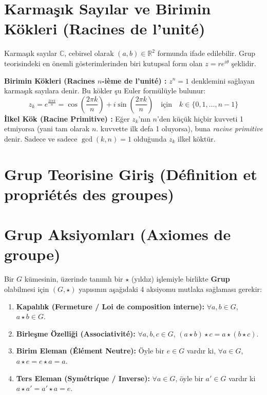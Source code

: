 \documentclass[12pt,a4paper]{report}
\begin{document}
\section{Karmaşık Sayılar ve Birimin Kökleri (Racines de l'unité)}
Karmaşık sayılar $\mathbb{C}$, cebirsel olarak $(a, b) \in \mathbb{R}^2$ formunda ifade edilebilir. Grup teorisindeki en önemli gösterimlerinden biri kutupsal form olan $z = r e^{i\theta}$ şeklidir. 

\textbf{Birimin Kökleri (Racines $n$-ième de l'unité) :} $z^n = 1$ denklemini sağlayan karmaşık sayılara denir.
Bu kökler şu Euler formülüyle bulunur:
\[ z_k = e^{\frac{2 i \pi k}{n}} = \cos\left(\frac{2\pi k}{n}\right) + i\sin\left(\frac{2\pi k}{n}\right) \quad \text{için} \quad k \in \{0, 1, \dots, n-1\} \]
\textbf{İlkel Kök (Racine Primitive) :} Eğer $z_k$'nın $n$'den küçük hiçbir kuvveti 1 etmiyorsa (yani tam olarak $n$. kuvvette ilk defa 1 oluyorsa), buna \textit{racine primitive} denir. Sadece ve sadece $\gcd(k, n) = 1$ olduğunda $z_k$ ilkel köktür.

\section{Grup Teorisine Giriş (Définition et propriétés des groupes)}

\section{Grup Aksiyomları (Axiomes de groupe)}
Bir $G$ kümesinin, üzerinde tanımlı bir $\star$ (yıldız) işlemiyle birlikte \textbf{Grup} olabilmesi için $(G, \star)$ yapısının aşağıdaki 4 aksiyomu mutlaka sağlaması gerekir:

\begin{tcolorbox}[colback=blue!5!white,colframe=blue!75!black,title=Grup Aksiyomları]
\begin{enumerate}
    \item \textbf{Kapalılık (Fermeture / Loi de composition interne):} $\forall a, b \in G$, $a \star b \in G$.
    \item \textbf{Birleşme Özelliği (Associativité):} $\forall a, b, c \in G$, $(a \star b) \star c = a \star (b \star c)$.
    \item \textbf{Birim Eleman (Élément Neutre):} Öyle bir $e \in G$ vardır ki, $\forall a \in G$, $a \star e = e \star a = a$.
    \item \textbf{Ters Eleman (Symétrique / Inverse):} $\forall a \in G$, öyle bir $a' \in G$ vardır ki $a \star a' = a' \star a = e$.
\end{enumerate}
\end{tcolorbox}
\end{document}
